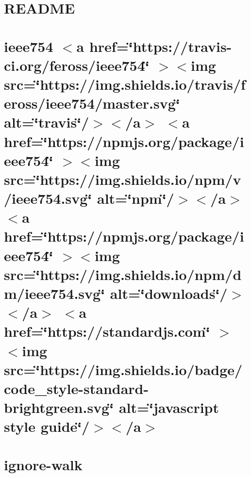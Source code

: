 \documentclass[twoside]{book}
\newcommand{\+}{\discretionary{\mbox{\scriptsize$\hookleftarrow$}}{}{}}
\begin{document}
\chapter{README}
\label{md__c___users_vaishnavi_jadhav__desktop__developer_code_mean_stack_example_client_node_modules_icss_utils__r_e_a_d_m_e}

\chapter{ieee754 \texorpdfstring{$<$}{<}a href=\char`\"{}https\+://travis-\/ci.\+org/feross/ieee754\char`\"{} \texorpdfstring{$>$}{>}\texorpdfstring{$<$}{<}img src=\char`\"{}https\+://img.\+shields.\+io/travis/feross/ieee754/master.\+svg\char`\"{} alt=\char`\"{}travis\char`\"{}/\texorpdfstring{$>$}{>}\texorpdfstring{$<$}{<}/a\texorpdfstring{$>$}{>} \texorpdfstring{$<$}{<}a href=\char`\"{}https\+://npmjs.\+org/package/ieee754\char`\"{} \texorpdfstring{$>$}{>}\texorpdfstring{$<$}{<}img src=\char`\"{}https\+://img.\+shields.\+io/npm/v/ieee754.\+svg\char`\"{} alt=\char`\"{}npm\char`\"{}/\texorpdfstring{$>$}{>}\texorpdfstring{$<$}{<}/a\texorpdfstring{$>$}{>} \texorpdfstring{$<$}{<}a href=\char`\"{}https\+://npmjs.\+org/package/ieee754\char`\"{} \texorpdfstring{$>$}{>}\texorpdfstring{$<$}{<}img src=\char`\"{}https\+://img.\+shields.\+io/npm/dm/ieee754.\+svg\char`\"{} alt=\char`\"{}downloads\char`\"{}/\texorpdfstring{$>$}{>}\texorpdfstring{$<$}{<}/a\texorpdfstring{$>$}{>} \texorpdfstring{$<$}{<}a href=\char`\"{}https\+://standardjs.\+com\char`\"{} \texorpdfstring{$>$}{>}\texorpdfstring{$<$}{<}img src=\char`\"{}https\+://img.\+shields.\+io/badge/code\+\_\+style-\/standard-\/brightgreen.\+svg\char`\"{} alt=\char`\"{}javascript style guide\char`\"{}/\texorpdfstring{$>$}{>}\texorpdfstring{$<$}{<}/a\texorpdfstring{$>$}{>}}
\label{md__c___users_vaishnavi_jadhav__desktop__developer_code_mean_stack_example_client_node_modules_ieee754__r_e_a_d_m_e}

\chapter{ignore-\/walk}
\label{md__c___users_vaishnavi_jadhav__desktop__developer_code_mean_stack_example_client_node_modules_ignore_walk__r_e_a_d_m_e}

\end{document}
